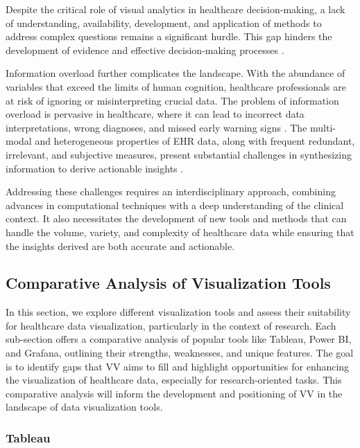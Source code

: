 Despite the critical role of visual analytics in healthcare decision-making, a lack of understanding, availability, development, and application of methods to address complex questions remains a significant hurdle. This gap hinders the development of evidence and effective decision-making processes \cite{soa17}\cite{soa18}.

Information overload further complicates the landscape. With the abundance of variables that exceed the limits of human cognition, healthcare professionals are at risk of ignoring or misinterpreting crucial data. The problem of information overload is pervasive in healthcare, where it can lead to incorrect data interpretations, wrong diagnoses, and missed early warning signs \cite{soa19}\cite{soa20}. The multi-modal and heterogeneous properties of EHR data, along with frequent redundant, irrelevant, and subjective measures, present substantial challenges in synthesizing information to derive actionable insights \cite{soa20}.

Addressing these challenges requires an interdisciplinary approach, combining advances in computational techniques with a deep understanding of the clinical context. It also necessitates the development of new tools and methods that can handle the volume, variety, and complexity of healthcare data while ensuring that the insights derived are both accurate and actionable.

\subsection{Comparative Analysis of Visualization Tools}\label{comparative-analysis-of-visualization-tools}

In this section, we explore different visualization tools and assess their suitability for healthcare data visualization, particularly in the context of research. Each sub-section offers a comparative analysis of popular tools like Tableau, Power BI, and Grafana, outlining their strengths, weaknesses, and unique features. The goal is to identify gaps that VV aims to fill and highlight opportunities for enhancing the visualization of healthcare data, especially for research-oriented tasks. This comparative analysis will inform the development and positioning of VV in the landscape of data visualization tools.

\subsubsection{Tableau}\label{tableau}

